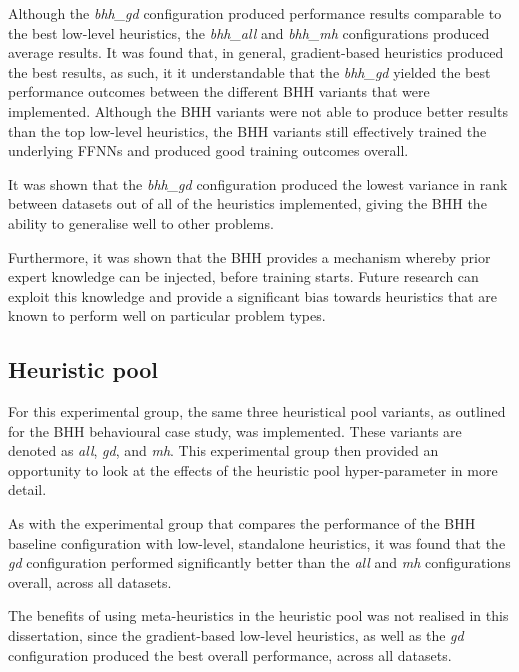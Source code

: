 Although the \textit{bhh\_gd} configuration produced performance results comparable to the best low-level heuristics, the \textit{bhh\_all} and \textit{bhh\_mh} configurations produced average results. It was found that, in general, gradient-based heuristics produced the best results, as such, it it understandable that the \textit{bhh\_gd}  yielded the best performance outcomes between the different \acs{BHH} variants that were implemented. Although the \acs{BHH} variants were not able to produce better results than the top low-level heuristics, the \acs{BHH} variants still effectively trained the underlying \acp{FFNN} and produced good training outcomes overall.

It was shown that the \textit{bhh\_gd} configuration produced the lowest variance in rank between datasets out of all of the heuristics implemented, giving the \acs{BHH} the ability to generalise well to other problems.

Furthermore, it was shown that the \acs{BHH} provides a mechanism whereby prior expert knowledge can be injected, before training starts. Future research can exploit this knowledge and provide a significant bias towards heuristics that are known to perform well on particular problem types.

\subsection{Heuristic pool}
\label{sec:conclusion:results:summary:heuristic_pool}

For this experimental group, the same three heuristical pool variants, as outlined for the \acs{BHH} behavioural case study, was implemented. These variants are denoted as \textit{all}, \textit{gd}, and \textit{mh}. This experimental group then provided an opportunity to look at the effects of the heuristic pool hyper-parameter in more detail.

As with the experimental group that compares the performance of the \acs{BHH} baseline configuration with low-level, standalone heuristics, it was found that the \textit{gd} configuration performed significantly better than the \textit{all} and \textit{mh} configurations overall, across all datasets.

The benefits of using meta-heuristics in the heuristic pool was not realised in this dissertation, since the gradient-based low-level heuristics, as well as the \textit{gd} configuration produced the best overall performance, across all datasets.

